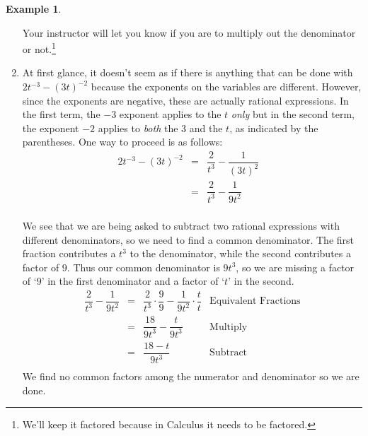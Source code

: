 \documentclass[11pt]{article}
\theoremstyle{definition}  %
\newtheorem{ex}{\bf Example}
\begin{document}
\begin{ex}
\begin{enumerate}
Your instructor will let you know if you are to multiply out the denominator or not.\footnote{We'll keep it factored because in Calculus it needs to be factored.}

\item  At first glance, it doesn't seem as if there is anything that can be done with $2t^{-3} - (3t)^{-2}$ because the exponents on the variables are different.  However, since the exponents are negative, these are actually rational expressions.  In the first term, the $-3$ exponent applies to the $t$ \textit{only} but in the second term, the exponent $-2$ applies to \textit{both} the $3$ and the $t$, as indicated by the parentheses.  One way to proceed is as follows:\[ \begin{array}{rclr}

 2t^{-3} - (3t)^{-2} & = & \dfrac{2}{t^3} - \dfrac{1}{(3t)^2} & \\ [10pt]
                     & = & \dfrac{2}{t^3} - \dfrac{1}{9t^2} & \\ \end{array}\]
										
We see that we are being asked to subtract two rational expressions with different denominators, so we need to find a common denominator.  The first fraction contributes a $t^3$ to the denominator, while the second contributes a factor of $9$.  Thus our common denominator is $9t^3$, so we are missing a factor of `$9$' in the first denominator and a factor of `$t$' in the second. \[ \begin{array}{rclr}

 \dfrac{2}{t^3} - \dfrac{1}{9t^2} & = &  \dfrac{2}{t^3} \cdot \dfrac{9}{9} - \dfrac{1}{9t^2} \cdot \dfrac{t}{t} & \text{Equivalent Fractions} \\ [10pt]

                                  & = &  \dfrac{18}{9t^3} - \dfrac{t}{9t^3} & \text{Multiply}\\ [10pt]
																	
																	& = & \dfrac{18 - t}{9t^3} & \text{Subtract} \\ \end{array}\]
We find no common factors among the numerator and denominator so we are done.  


\end{enumerate}
\end{ex}
\end{document}
